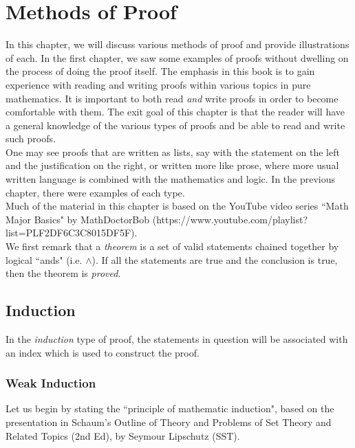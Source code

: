 \chapter{Methods of Proof}

In this chapter, we will discuss various methods of proof and provide illustrations of each.  In the first chapter, we saw some examples of proofs without dwelling on the process of doing the proof itself.  The emphasis in this book is to gain experience with reading and writing proofs within various topics in pure mathematics.  It is important to both read \textit{and} write proofs in order to become comfortable with them.  The exit goal of this chapter is that the reader will have a general knowledge of the various types of proofs and be able to read and write such proofs.\\

One may see proofs that are written as lists, say with the statement on the left and the justification on the right, or written more like prose, where more usual written language is combined with the mathematics and logic.  In the previous chapter, there were examples of each type.\\

Much of the material in this chapter is based on the YouTube video series ``Math Major Basics" by MathDoctorBob (https://www.youtube.com/playlist?list=PLF2DF6C3C8015DF5F).\\

We first remark that a \textit{theorem} is a set of valid statements chained together by logical ``ands" (i.e. $\land$).  If all the statements are true and the conclusion is true, then the theorem is \textit{proved}.

\section{Induction}

In the \textit{induction} type of proof, the statements in question will be associated with an index which is used to construct the proof.

\subsection{Weak Induction}

Let us begin by stating the ``principle of mathematic induction", based on the presentation in Schaum's Outline of Theory and Problems of Set Theory and Related Topics (2nd Ed), by Seymour Lipschutz (SST).\\

